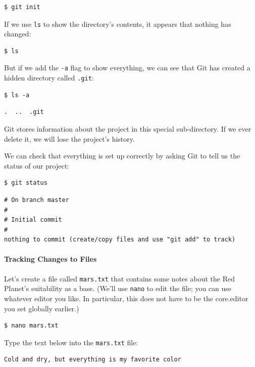 \documentclass{book}
\begin{document}
\begin{verbatim}
$ git init
\end{verbatim}

If we use \texttt{ls} to show the directory's contents, it appears that
nothing has changed:

\begin{verbatim}
$ ls
\end{verbatim}

But if we add the \texttt{-a} flag to show everything, we can see that
Git has created a hidden directory called \texttt{.git}:

\begin{verbatim}
$ ls -a
\end{verbatim}

\begin{verbatim}
.  ..  .git
\end{verbatim}

Git stores information about the project in this special sub-directory.
If we ever delete it, we will lose the project's history.

We can check that everything is set up correctly by asking Git to tell
us the status of our project:

\begin{verbatim}
$ git status
\end{verbatim}

\begin{verbatim}
# On branch master
#
# Initial commit
#
nothing to commit (create/copy files and use "git add" to track)
\end{verbatim}

\mbox{}\paragraph{Tracking Changes to Files}

Let's create a file called \texttt{mars.txt} that contains some notes
about the Red Planet's suitability as a base. (We'll use \texttt{nano}
to edit the file; you can use whatever editor you like. In particular,
this does not have to be the core.editor you set globally earlier.)

\begin{verbatim}
$ nano mars.txt
\end{verbatim}

Type the text below into the \texttt{mars.txt} file:

\begin{verbatim}
Cold and dry, but everything is my favorite color
\end{verbatim}
\end{document}
